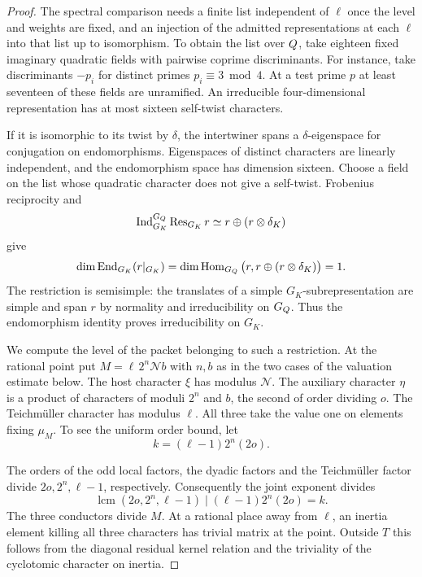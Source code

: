 \begin{proof}

The spectral comparison needs a finite list independent of
\(\ell\) once the level and weights are fixed, and an injection
of the admitted representations at each \(\ell\) into that
list up to isomorphism. To obtain the list over \(Q\), take
eighteen fixed imaginary quadratic fields with pairwise coprime
discriminants. For instance, take discriminants \(-p_i\) for
distinct primes \(p_i\equiv 3\bmod4\). At a test prime \(p\)
at least seventeen of these fields are unramified.
An irreducible four-dimensional representation has at most
sixteen self-twist characters.

If it is isomorphic to its
twist by \(\delta\), the intertwiner spans a
\(\delta\)-eigenspace for conjugation on endomorphisms.
Eigenspaces of distinct characters are linearly independent,
and the endomorphism space has dimension sixteen.
Choose a field on the list whose quadratic character
does not give a self-twist. Frobenius reciprocity and
\[
\operatorname{Ind}_{G_K}^{G_Q}\operatorname{Res}_{G_K}r
          \simeq r\oplus(r\otimes\delta_K)
\]
give
\[
 \dim\operatorname{End}_{G_K}(r|_{G_K})
   =\dim\operatorname{Hom}_{G_Q}\big(r,r\oplus(r\otimes\delta_K)\big)=1.
\]
The restriction is semisimple: the translates of a simple
\(G_K\)-subrepresentation are simple and span \(r\) by
normality and irreducibility on \(G_Q\). Thus the
endomorphism identity proves irreducibility on \(G_K\).

We compute the level of the packet belonging to such a
restriction. At the rational point put \(M=\ell\,2^n\mathcal N b\)
with \(n,b\) as in the two cases of the valuation estimate below. The host character \(\xi\)
has modulus \(\mathcal N\). The auxiliary character \(\eta\) is
a product of characters of moduli \(2^n\) and \(b\), the second
of order dividing \(o\). The Teichm\"uller character has modulus
\(\ell\). All three take the value one on elements fixing
\(\mu_M\). To see the uniform order bound, let
\[
 k=(\ell-1)2^n(2o).
\]

The orders of the odd local factors, the dyadic factors and
the Teichm\"uller factor divide \(2o,2^n,\ell-1\), respectively.
Consequently the joint exponent divides
\[
 \operatorname{lcm}(2o,2^n,\ell-1)\mid (\ell-1)2^n(2o)=k .
\]
The three conductors divide \(M\).
At a rational place away from \(\ell\), an inertia element
killing all three characters has trivial matrix at the point.
Outside \(T\) this follows from the diagonal residual kernel
relation and the triviality of the cyclotomic character on
inertia.


\end{proof}
